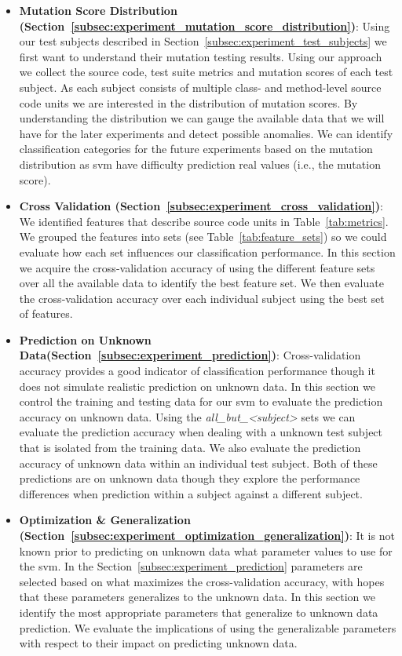 \begin{itemize}
  \item \textbf{Mutation Score Distribution (Section~\ref{subsec:experiment_mutation_score_distribution})}: Using our test subjects described in Section~\ref{subsec:experiment_test_subjects} we first want to understand their mutation testing results. Using our approach we collect the source code, test suite metrics and mutation scores of each test subject. As each subject consists of multiple class- and method-level source code units we are interested in the distribution of mutation scores. By understanding the distribution we can gauge the available data that we will have for the later experiments and detect possible anomalies. We can identify classification categories for the future experiments based on the mutation distribution as \gls{svm} have difficulty prediction real values (i.e., the mutation score).
  \item \textbf{Cross Validation (Section~\ref{subsec:experiment_cross_validation})}: We identified features that describe source code units in Table~\ref{tab:metrics}. We grouped the features into sets (see Table~\ref{tab:feature_sets}) so we could evaluate how each set influences our classification performance. In this section we acquire the cross-validation accuracy of using the different feature sets over all the available data to identify the best feature set. We then evaluate the cross-validation accuracy over each individual subject using the best set of features.
  \item \textbf{Prediction on Unknown Data(Section~\ref{subsec:experiment_prediction})}: Cross-validation accuracy provides a good indicator of classification performance though it does not simulate realistic prediction on unknown data. In this section we  control the training and testing data for our \gls{svm} to evaluate the prediction accuracy on unknown data. Using the \emph{all\_but\_<subject>} sets we can evaluate the prediction accuracy when dealing with a unknown test subject that is isolated from the training data. We also evaluate the prediction accuracy of unknown data within an individual test subject. Both of these predictions are on unknown data though they explore the performance differences when prediction within a subject against a different subject.
  \item \textbf{Optimization \& Generalization (Section~\ref{subsec:experiment_optimization_generalization})}: It is not known prior to predicting on unknown data what parameter values to use for the \gls{svm}. In the Section~\ref{subsec:experiment_prediction} parameters are selected based on what maximizes the cross-validation accuracy, with hopes that these parameters generalizes to the unknown data. In this section we identify the most appropriate parameters that generalize to unknown data prediction. We evaluate the implications of using the generalizable parameters with respect to their impact on predicting unknown data.

\end{itemize}
